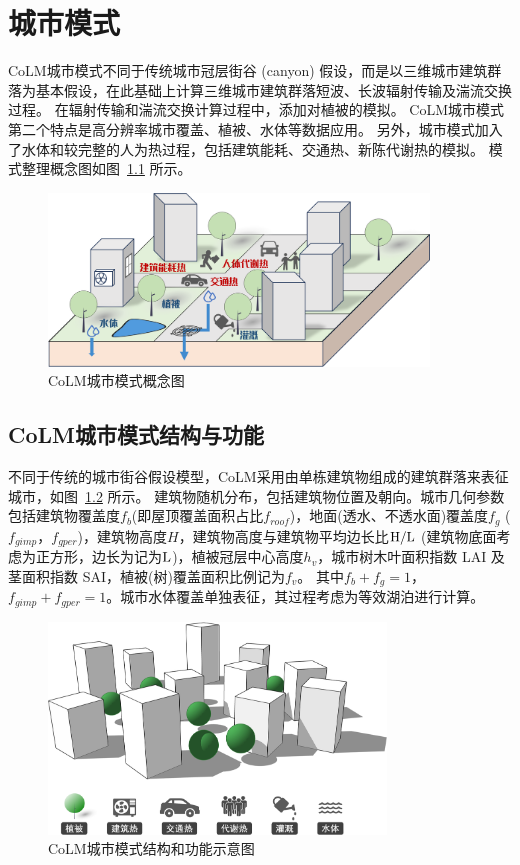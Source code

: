\chapter{城市模式}\label{城市模式}
CoLM城市模式不同于传统城市冠层街谷 (canyon) 假设，而是以三维城市建筑群落为基本假设，在此基础上计算三维城市建筑群落短波、长波辐射传输及湍流交换过程。
在辐射传输和湍流交换计算过程中，添加对植被的模拟。
CoLM城市模式第二个特点是高分辨率城市覆盖、植被、水体等数据应用。
另外，城市模式加入了水体和较完整的人为热过程，包括建筑能耗、交通热、新陈代谢热的模拟。
模式整理概念图如图~\ref{fig:CoLM城市模式概念图} 所示。
\newline
{
\begin{figure}[htbp]
\centering
\includegraphics[width=0.9\textwidth]{Figures/城市模式/CoLM城市模式概念图.png}
\caption{CoLM城市模式概念图}
\label{fig:CoLM城市模式概念图}
\end{figure}
}

\section{CoLM城市模式结构与功能}
不同于传统的城市街谷假设模型，CoLM采用由单栋建筑物组成的建筑群落来表征城市，如图~\ref{fig:CoLM城市模式结构和功能示意图} 所示。
建筑物随机分布，包括建筑物位置及朝向。城市几何参数包括建筑物覆盖度$f_b$(即屋顶覆盖面积占比$f_{roof}$)，地面(透水、不透水面)覆盖度$f_g$ ($f_{gimp}$，$f_{gper}$)，建筑物高度$H$，建筑物高度与建筑物平均边长比$\rm H/L$ (建筑物底面考虑为正方形，边长为记为$\rm L$)，植被冠层中心高度$h_v$，城市树木叶面积指数 LAI 及茎面积指数 SAI，植被(树)覆盖面积比例记为$f_v$。
其中$f_b+f_g=1$，$f_{gimp}+f_{gper}=1$。城市水体覆盖单独表征，其过程考虑为等效湖泊进行计算。

{
\begin{figure}[htbp]
\centering
\includegraphics[width=0.8\textwidth]{Figures/城市模式/CoLM城市模式结构和功能示意图.png}
\caption{CoLM城市模式结构和功能示意图}
\label{fig:CoLM城市模式结构和功能示意图}
\end{figure}
}

